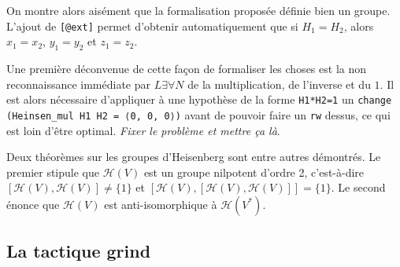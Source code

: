 \documentclass[10pt]{article}
\theoremstyle{definition}
\begin{document}
On montre alors aisément que  la formalisation proposée définie bien un groupe. L'ajout de \lstinline|[@ext]| permet d'obtenir automatiquement que si $H_1=H_2$, alors $x_1=x_2$, $y_1=y_2$ et $z_1=z_2$.
\newline

Une première déconvenue de cette façon de formaliser les choses est la non reconnaissance immédiate par $L\exists\forall N$ de la multiplication, de l'inverse et du $1$. Il est alors nécessaire d'appliquer à une hypothèse de la forme \lstinline|H1*H2=1| un \lstinline|change (Heinsen_mul H1 H2 = ⟨0, 0, 0⟩)| avant de pouvoir faire un \lstinline|rw| dessus, ce qui est loin d'être optimal.
\textit{Fixer le problème et mettre ça là}.
\newline

Deux théorèmes sur les groupes d'Heisenberg sont entre autres démontrés. Le premier stipule que $\mathcal{H}(V)$ est un groupe nilpotent d'ordre 2, c'est-à-dire $[\mathcal{H}(V),\mathcal{H}(V)]\ne\{1\}$ et $[\mathcal{H}(V),[\mathcal{H}(V),\mathcal{H}(V)]]=\{1\}$. 
\newline
Le second énonce que $\mathcal{H}(V)$ est anti-isomorphique à $\mathcal{H}(V^*)$.

\subsection{La tactique grind}
\end{document}
